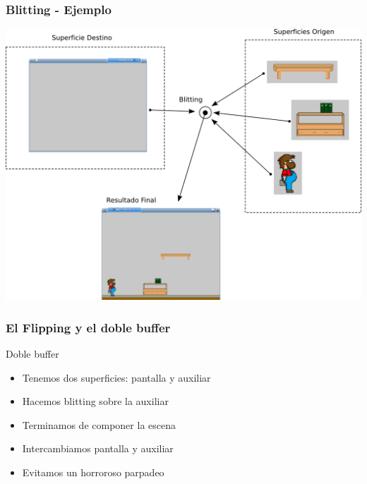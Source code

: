 \begin{frame}
    \frametitle{Blitting - Ejemplo}

    \begin{center}
		\includegraphics[scale=0.5]{img/Blitting.png}
	\end{center}
    
\end{frame}

\begin{frame}
    \frametitle{El Flipping y el doble buffer}
    
	\begin{block}{Doble buffer}
        \begin{itemize}
            \item Tenemos dos superficies: pantalla y auxiliar
            \item Hacemos blitting sobre la auxiliar
            \item Terminamos de componer la escena
            \item Intercambiamos pantalla y auxiliar
            \item Evitamos un horroroso parpadeo
        \end{itemize}            
    \end{block}
    
\end{frame}

